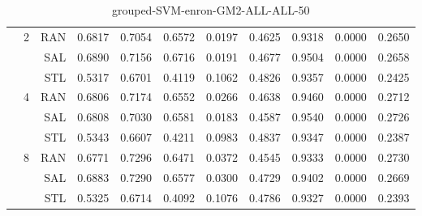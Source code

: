 \begin{center}
\begin{table}[htbp]
\begin{center}
\begin{tabular}{ | r | r | r | r | r | r | r | r | r | r | r |}
 & \multirow{3}{*}{2} & RAN & 0.6817 & 0.7054 & 0.6572 & 0.0197 & 0.4625 & 0.9318 & 0.0000 & 0.2650\\ \cline{3-11}
 &   & SAL & 0.6890 & 0.7156 & 0.6716 & 0.0191 & 0.4677 & 0.9504 & 0.0000 & 0.2658\\ \cline{3-11}
 &   & STL & 0.5317 & 0.6701 & 0.4119 & 0.1062 & 0.4826 & 0.9357 & 0.0000 & 0.2425\\ \cline{2-11}
 & \multirow{3}{*}{4} & RAN & 0.6806 & 0.7174 & 0.6552 & 0.0266 & 0.4638 & 0.9460 & 0.0000 & 0.2712\\ \cline{3-11}
 &   & SAL & 0.6808 & 0.7030 & 0.6581 & 0.0183 & 0.4587 & 0.9540 & 0.0000 & 0.2726\\ \cline{3-11}
 &   & STL & 0.5343 & 0.6607 & 0.4211 & 0.0983 & 0.4837 & 0.9347 & 0.0000 & 0.2387\\ \cline{2-11}
 & \multirow{3}{*}{8} & RAN & 0.6771 & 0.7296 & 0.6471 & 0.0372 & 0.4545 & 0.9333 & 0.0000 & 0.2730\\ \cline{3-11}
 &   & SAL & 0.6883 & 0.7290 & 0.6577 & 0.0300 & 0.4729 & 0.9402 & 0.0000 & 0.2669\\ \cline{3-11}
 &   & STL & 0.5325 & 0.6714 & 0.4092 & 0.1076 & 0.4786 & 0.9327 & 0.0000 & 0.2393\\ \cline{2-11}
\hline
\end{tabular}
\caption{grouped-SVM-enron-GM2-ALL-ALL-50}
\end{center}
 \end{table}
\end{center}

